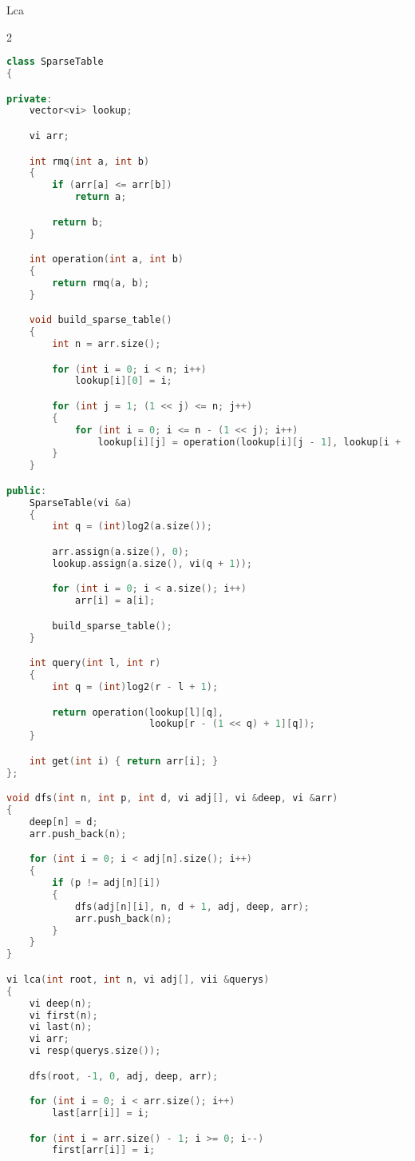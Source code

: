 \documentclass[leter]{amsart}
\begin{document}
Lca
\begin{multicols}{2}
\begin{lstlisting}[language=C++]
class SparseTable
{

private:
    vector<vi> lookup;

    vi arr;

    int rmq(int a, int b)
    {
        if (arr[a] <= arr[b])
            return a;

        return b;
    }

    int operation(int a, int b)
    {
        return rmq(a, b);
    }

    void build_sparse_table()
    {
        int n = arr.size();

        for (int i = 0; i < n; i++)
            lookup[i][0] = i;

        for (int j = 1; (1 << j) <= n; j++)
        {
            for (int i = 0; i <= n - (1 << j); i++)
                lookup[i][j] = operation(lookup[i][j - 1], lookup[i + (1 << (j - 1))][j - 1]);
        }
    }

public:
    SparseTable(vi &a)
    {
        int q = (int)log2(a.size());

        arr.assign(a.size(), 0);
        lookup.assign(a.size(), vi(q + 1));

        for (int i = 0; i < a.size(); i++)
            arr[i] = a[i];

        build_sparse_table();
    }

    int query(int l, int r)
    {
        int q = (int)log2(r - l + 1);

        return operation(lookup[l][q],
                         lookup[r - (1 << q) + 1][q]);
    }

    int get(int i) { return arr[i]; }
};

void dfs(int n, int p, int d, vi adj[], vi &deep, vi &arr)
{
    deep[n] = d;
    arr.push_back(n);

    for (int i = 0; i < adj[n].size(); i++)
    {
        if (p != adj[n][i])
        {
            dfs(adj[n][i], n, d + 1, adj, deep, arr);
            arr.push_back(n);
        }
    }
}

vi lca(int root, int n, vi adj[], vii &querys)
{
    vi deep(n);
    vi first(n);
    vi last(n);
    vi arr;
    vi resp(querys.size());

    dfs(root, -1, 0, adj, deep, arr);

    for (int i = 0; i < arr.size(); i++)
        last[arr[i]] = i;

    for (int i = arr.size() - 1; i >= 0; i--)
        first[arr[i]] = i;


\end{lstlisting}
\end{multicols}
\end{document}
